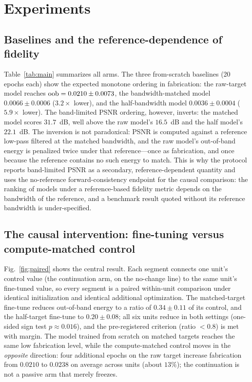 \section{Experiments}
\label{sec:experiments}



\subsection{Baselines and the reference-dependence of fidelity}
\label{sec:baselines}

Table~\ref{tab:main} summarizes all arms. The three from-scratch baselines (20 epochs each) show the expected monotone ordering in fabrication: the raw-target model reaches $\mathrm{oob} = 0.0210 \pm 0.0073$, the bandwidth-matched model $0.0066 \pm 0.0006$ ($3.2\times$ lower), and the half-bandwidth model $0.0036 \pm 0.0004$ ($5.9\times$ lower). The band-limited PSNR ordering, however, inverts: the matched model scores $31.7$~dB, well above the raw model's $16.5$~dB and the half model's $22.1$~dB. The inversion is not paradoxical: PSNR is computed against a reference low-pass filtered at the matched bandwidth, and the raw model's out-of-band energy is penalized twice under that reference---once as fabrication, and once because the reference contains no such energy to match. This is why the protocol reports band-limited PSNR as a secondary, reference-dependent quantity and uses the no-reference forward-consistency endpoint for the causal comparison: the ranking of models under a reference-based fidelity metric depends on the bandwidth of the reference, and a benchmark result quoted without its reference bandwidth is under-specified.

\subsection{The causal intervention: fine-tuning versus compute-matched control}
\label{sec:main-control}

Fig.~\ref{fig:paired} shows the central result. Each segment connects one unit's control value (the continuation arm, on the no-change line) to the same unit's fine-tuned value, so every segment is a paired within-unit comparison under identical initialization and identical additional optimization. The matched-target fine-tune reduces out-of-band energy to a ratio of $0.34 \pm 0.11$ of its control, and the half-target fine-tune to $0.20 \pm 0.08$; all six units reduce in both settings (one-sided sign test $p \approx 0.016$), and the pre-registered criterion (ratio $< 0.8$) is met with margin. The model trained from scratch on matched targets reaches the same low fabrication level, while the compute-matched control moves in the \emph{opposite} direction: four additional epochs on the raw target increase fabrication from $0.0210$ to $0.0238$ on average across units (about $13\%$); the continuation is not a passive arm that merely freezes.

